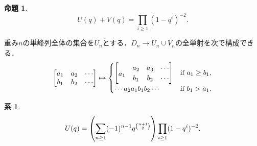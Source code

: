 \documentclass[xelatex,ja=standard,a4paper,14pt,everyparhook=compat]{bxjsarticle}
\newcommand{\up}[1]{\smash{\raisebox{.5\normalbaselineskip}{$#1$}}}
\theoremstyle{definition}
\newtheorem{proposition}[theorem]{命題}
\newtheorem{corollary}[theorem]{系}
\begin{document}
\begin{proposition}
    \begin{equation*}
        U(q) + V(q) = \prod_{i \geq 1} (1-q^i)^{-2}.
    \end{equation*}
\end{proposition}

重み$n$の単峰列全体の集合を$U_n$とする．$D_n \to U_n \cup V_n$の全単射を次で構成できる． \begin{equation*}
    \begin{bmatrix}
        a_1 & a_2 & \cdots \\
        b_1 & b_2 & \cdots
    \end{bmatrix} \mapsto \begin{cases}
        \begin{bmatrix}
                     & a_2 & a_3 & \cdots \\
            \up{a_1} & b_1 & b_2 & \cdots
        \end{bmatrix} & \text{if $a_1 \geq b_1$}, \\
        \cdots a_2 a_1 b_1 b_2 \cdots & \text{if $b_1 > a_1$}.
    \end{cases}
\end{equation*}

\begin{corollary}
    \begin{equation*}
        U(q) = \mleft( \sum_{n \geq 1} (-1)^{n-1} q^{\binom{n+1}{2}} \mright) \prod_{i \geq 1} (1-q^i)^{-2}.
    \end{equation*}
\end{corollary}
\end{document}

